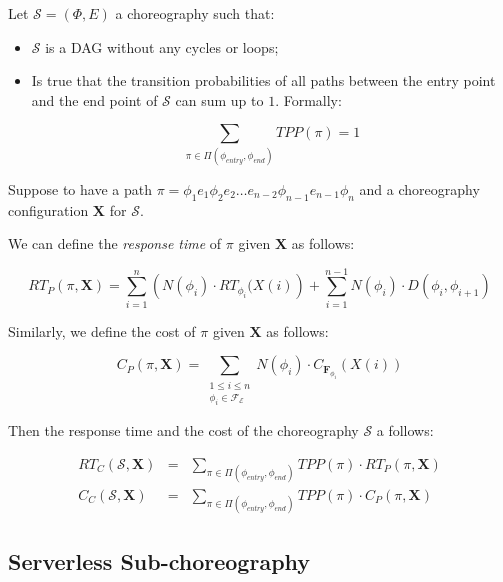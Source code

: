 Let $\mathcal{S} = (\Phi,E)$ a choreography such that:
\begin{itemize}
	\item $\mathcal{S}$ is a DAG without any cycles or loops;
	\item Is true that the transition probabilities of all paths between the entry point and
	the end point of $\mathcal{S}$ can sum up to $1$. Formally:
	
	\begin{equation}
		\sum_{\pi \in \Pi(\phi_{entry}, \phi_{end})} TPP(\pi) = 1
	\end{equation}

\end{itemize}

Suppose to have a path $\pi = \phi_1 e_1 \phi_2 e_2 \ldots e_{n-2}\phi_{n-1} e_{n-1} \phi_n$ and a choreography configuration $\textbf{X}$ for $\mathcal{S}$. 

We can define the \textit{response time} of $\pi$ given $\textbf{X}$ as follows:

\begin{equation}
	RT_P(\pi, \textbf{X}) = \sum_{i = 1}^n \left(  N(\phi_i) \cdot RT_{\phi_i} (X(i) \right)  + \sum_{i = 1}^{n-1} N(\phi_i) \cdot D(\phi_i,\phi_{i+1})
\end{equation}

Similarly, we define the cost of $\pi$ given $\textbf{X}$ as follows:

\begin{equation}
	C_P(\pi, \textbf{X}) = \sum_{\substack{1\le i\le n\\ \phi_i \in \mathscr{F_E}}} N(\phi_i) \cdot C_{\textbf{F}_{\phi_i}} (X(i))
\end{equation}


Then the response time and the cost of the choreography $\mathcal{S}$ a follows:

\begin{eqnarray}
	RT_C(\mathcal{S}, \textbf{X}) & = & \sum_{\pi \in \Pi(\phi_{entry}, \phi_{end})} TPP(\pi) \cdot RT_{P}(\pi, \textbf{X}) \\
	C_C(\mathcal{S}, \textbf{X}) & = & \sum_{\pi \in \Pi(\phi_{entry}, \phi_{end})} TPP(\pi) \cdot C_{P}(\pi, \textbf{X}) 
\end{eqnarray}

\subsection{Serverless Sub-choreography}

